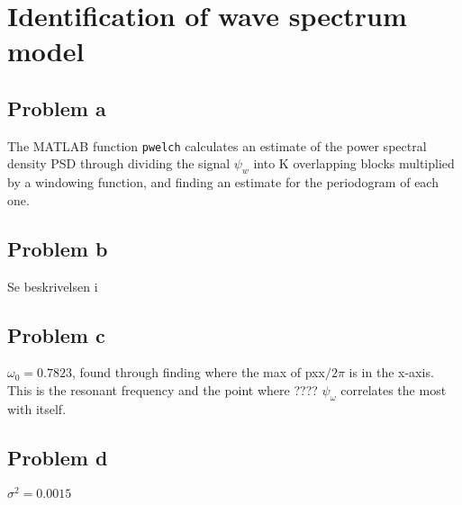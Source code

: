 \section{Identification of wave spectrum model}
\subsection{Problem a}
The MATLAB function \texttt{pwelch} calculates an estimate of the power spectral density PSD through
dividing the signal $\psi_w$ into K overlapping blocks multiplied by a windowing function, and finding an
estimate for the periodogram of each one.

\subsection{Problem b}
Se beskrivelsen i 

\subsection{Problem c}

$\omega_0 = 0.7823$, found through finding where the max of pxx$/2\pi$ is in the x-axis. This is the resonant frequency and the point where ???? $\psi_\omega$ correlates the most with itself.

\subsection{Problem d}
$\sigma^2 = 0.0015$
